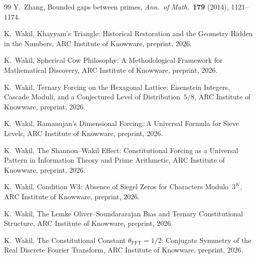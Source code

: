 \documentclass[12pt]{amsart}
\theoremstyle{plain}
\theoremstyle{definition}
\theoremstyle{remark}
\begin{document}
\begin{thebibliography}{99}
Y.~Zhang,
Bounded gaps between primes,
\emph{Ann.\ of Math.}\ \textbf{179} (2014), 1121--1174.

K.~Wakil,
Khayyam's Triangle: Historical Restoration and the Geometry Hidden in the
Numbers,
ARC Institute of Knowware, preprint, 2026.

K.~Wakil,
Spherical Cow Philosophy: A Methodological Framework for Mathematical
Discovery,
ARC Institute of Knowware, preprint, 2026.

K.~Wakil,
Ternary Forcing on the Hexagonal Lattice: Eisenstein Integers, Cascade
Moduli, and a Conjectured Level of Distribution~$5/8$,
ARC Institute of Knowware, preprint, 2026.

K.~Wakil,
Ramanujan's Dimensional Forcing: A Universal Formula for Sieve Levels,
ARC Institute of Knowware, preprint, 2026.

K.~Wakil,
The Shannon--Wakil Effect: Constitutional Forcing as a Universal Pattern
in Information Theory and Prime Arithmetic,
ARC Institute of Knowware, preprint, 2026.

K.~Wakil,
Condition W3: Absence of Siegel Zeros for Characters Modulo~$3^K$,
ARC Institute of Knowware, preprint, 2026.

K.~Wakil,
The Lemke Oliver--Soundararajan Bias and Ternary Constitutional Structure,
ARC Institute of Knowware, preprint, 2026.

K.~Wakil,
The Constitutional Constant $\theta_{\mathrm{FFT}} = 1/2$: Conjugate Symmetry
of the Real Discrete Fourier Transform,
ARC Institute of Knowware, preprint, 2026.

\end{thebibliography}
\end{document}
